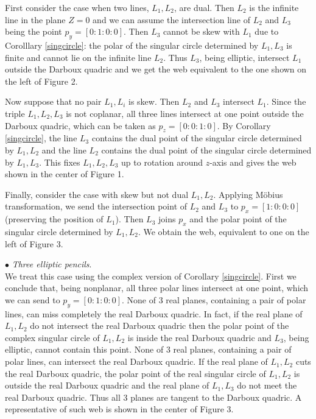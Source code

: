 \documentclass[11pt,a4paper]{article}
\begin{document}
First consider the case when two lines, $L_1,L_2$, are dual. Then $L_2$ is the infinite line in the plane $Z=0$ and we can assume the intersection line of $L_2$ and $L_3$ being the point $p_y=[0:1:0:0]$. Then $L_3$ cannot be skew with $L_1$ due to Corolllary \ref{singcircle}: the polar of the singular circle determined by $L_1,L_3$ is finite and cannot lie on the infinite line $L_2$. Thus $L_3$, being elliptic, intersect $L_1$ outside the Darboux quadric and we get the web equivalent to the one shown on the left of Figure 2.     

Now suppose that no pair $L_1,L_i$ is  skew. Then $L_2$ and $L_3$ intersect $L_1$. Since the triple $L_1,L_2,L_3$ is not coplanar, all three lines intersect at one point outside the Darboux quadric, which can be taken as $p_z=[0:0:1:0]$. By Corollary \ref{singcircle}, the line $L_3$ contains the dual point of the singular circle determined by $L_1,L_2$ and the line $L_2$ contains the dual point of the singular circle determined by $L_1,L_3$.  This fixes $L_1,L_2,L_3$ up to rotation around $z$-axis and gives the web shown in the center of  Figure 1.  

Finally, consider the case with skew but not dual $L_1,L_2$. Applying Möbius transformation, we send the intersection point of $L_2$ and $L_3$ to $p_x=[1:0:0:0]$ (preserving the position of $L_1$). Then $L_3$ joins $p_x$ and the polar point of the singular circle determined by $L_1,L_2$. We obtain  the web, equivalent to one on the left of Figure 3. 


{$\bullet$ \it Three elliptic pencils}.\\  
We treat this case  using the complex version of Corollary \ref{singcircle}. First we conclude that, being nonplanar, all three polar lines intersect at one point, which we can send to $p_y=[0:1:0:0]$. None of 3 real planes, containing a pair of polar lines, can miss completely the real Darboux quadric.  In fact, if the real plane of $L_1,L_2$ do not intersect the real Darboux quadric then  the polar point of the complex singular circle of $L_1,L_2$ is inside the real Darboux quadric and $L_3$, being elliptic, cannot contain this point. None of 3 real planes, containing a pair of polar lines, can intersect the real Darboux quadric. If the real plane of $L_1,L_2$ cuts the real Darboux quadric,   the polar point of the real singular circle of $L_1,L_2$ is outside the real Darboux quadric and the real plane of $L_1,L_3$ do not meet the real Darboux quadric. Thus all 3 planes are tangent to the Darboux quadric.    
A representative of such web is shown in the center of Figure 3.   
\end{document}
